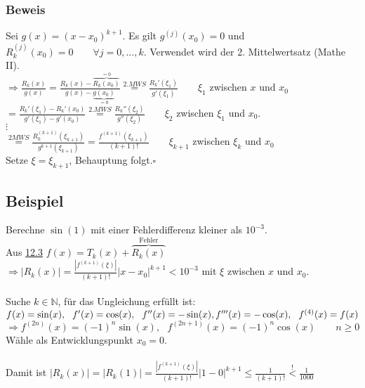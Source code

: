 \documentclass[a4paper, 12pt,titlepage, pdf, headsepline]{scrartcl}
\newcommand{\N}{\mathds{N}}
\newcommand{\qed}{\hfill$\square$}
\renewcommand{\>}{\rightarrow}
\renewcommand{\*}{\cdot}
\begin{document}
\subsubsection*{Beweis}
Sei $g(x) = (x-x_0)^{k+1}$. Es gilt $g^{(j)}(x_0) = 0$ und $R_k^{(j)}(x_0) = 0 \qquad \forall j = 0,...,k.$ Verwendet wird der 2. Mittelwertsatz (Mathe II).\\
$\Rightarrow \frac{R_k(x)}{g(x)} = \frac{R_k(x) - \overbrace{R_k(x_0)}^{=0}}{g(x) - \underbrace{g(x_0)}_{=0}} \overset{2.MWS}{=} \frac{R_k'(\xi_1)}{g'(\xi_1)} \qquad \xi_1$ zwischen $x$ und $x_0$\\
\noindent\hspace*{15mm}$= \frac{R_k'(\xi_1) - R_k'(x_0)}{g'(\xi_1) - g'(x_0)} \overset{2.MWS}{=} \frac{R_k''(\xi_2)}{g''(\xi_2)}\qquad \xi_2$ zwischen $\xi_1$ und $x_0$.\\
\noindent\hspace*{16mm}$\vdots$\\
\noindent\hspace*{11.5mm}$\overset{2MWS}{=} \frac{R_k^{(k+1)}(\xi_{k+1})}{g^{k+1}(\xi_{k+1})} = \frac{f^{(k+1)}(\xi_{k+1})}{(k+1)!}\qquad \xi_{k+1}$ zwischen $\xi_k$ und $x_0$\\
Setze $\xi = \xi_{k+1}$, Behauptung folgt.\qed
\subsection{Beispiel}
Berechne $\sin(1)$ mit einer Fehlerdifferenz kleiner als $10^{-3}$.\\
Aus \hyperref[12.3]{12.3} $f(x) = T_k(x) + \overbrace{R_k(x)}^{\text{Fehler}}$\\

$\Rightarrow |R_k(x)| = \frac{|f^{(k+1)}(\xi)|}{(k+1)!} |x - x_0|^{k+1} < 10^{-3}$ mit $\xi$ zwischen $x$ und $x_0$.\\
\\
Suche $k \in \N$, für das Ungleichung erfüllt ist: \\
$f(x) = \sin(x),~~ f'(x) = \cos(x),~~ f''(x) = -\sin(x),\\ f'''(x) = -\cos(x),~~f^{(4)}(x)=f(x)$\\

$\Rightarrow f^{(2n)}(x) = (-1)^n \sin(x),~~~ f^{(2n+1)}(x) = (-1)^n \cos(x) \qquad n \geq 0$\\
Wähle als Entwicklungspunkt $x_0 = 0$.\\
\\
Damit ist $|R_k(x)| = |R_k(1)| = \frac{|f^{(k+1)}(\xi)|}{(k+1)!} |1-0|^{k+1} \leq \frac{1}{(k+1)!} \overset{!}{<} \frac{1}{1000}$\\
\end{document}
